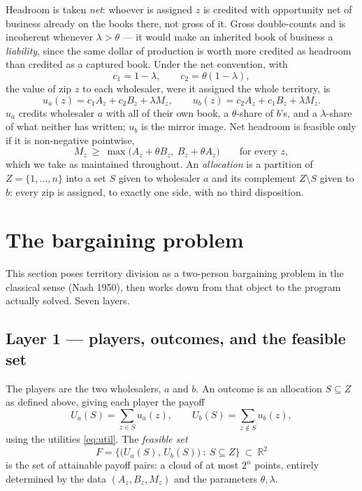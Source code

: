 \documentclass[11pt]{article}
\theoremstyle{remark}\newtheorem*{remark}{Remark}
\begin{document}
Headroom is taken \emph{net}: whoever is assigned $z$ is credited with opportunity net of
business already on the books there, not gross of it. Gross double-counts and is
incoherent whenever $\lambda>\theta$ --- it would make an inherited book of business a
\emph{liability}, since the same dollar of production is worth more credited as headroom
than credited as a captured book. Under the net convention, with
\begin{equation}\label{eq:coefs}
c_1=1-\lambda,\qquad c_2=\theta(1-\lambda),
\end{equation}
the value of zip $z$ to each wholesaler, were it assigned the whole territory, is
\begin{equation}\label{eq:util}
u_a(z)=c_1A_z+c_2B_z+\lambda M_z,\qquad u_b(z)=c_2A_z+c_1B_z+\lambda M_z .
\end{equation}
$u_a$ credits wholesaler $a$ with all of their own book, a $\theta$-share of $b$'s, and a
$\lambda$-share of what neither has written; $u_b$ is the mirror image. Net headroom is
feasible only if it is non-negative pointwise,
\begin{equation}\label{eq:headroom}
M_z\ \ge\ \max\bigl(A_z+\theta B_z,\ B_z+\theta A_z\bigr)\qquad\text{for every }z,
\end{equation}
which we take as maintained throughout. An \emph{allocation} is a partition of
$Z=\{1,\dots,n\}$ into a set $S$ given to wholesaler $a$ and its complement
$Z\setminus S$ given to $b$: every zip is assigned, to exactly one side, with no third
disposition.

\section{The bargaining problem}\label{sec:statement}

This section poses territory division as a two-person bargaining problem in the classical
sense (Nash 1950), then works down from that object to the program actually solved.
Seven layers.

\subsection{Layer 1 --- players, outcomes, and the feasible set}
The players are the two wholesalers, $a$ and $b$. An outcome is an allocation $S\subseteq
Z$ as defined above, giving each player the payoff
\begin{equation}\label{eq:payoffs}
U_a(S)=\sum_{z\in S}u_a(z),\qquad U_b(S)=\sum_{z\notin S}u_b(z),
\end{equation}
using the utilities \eqref{eq:util}. The \emph{feasible set}
\begin{equation}
F=\bigl\{\bigl(U_a(S),\,U_b(S)\bigr)\ :\ S\subseteq Z\bigr\}\ \subset\ \mathbb{R}^2
\end{equation}
is the set of attainable payoff pairs: a cloud of at most $2^n$ points, entirely
determined by the data $(A_z,B_z,M_z)$ and the parameters $\theta,\lambda$.
\end{document}
